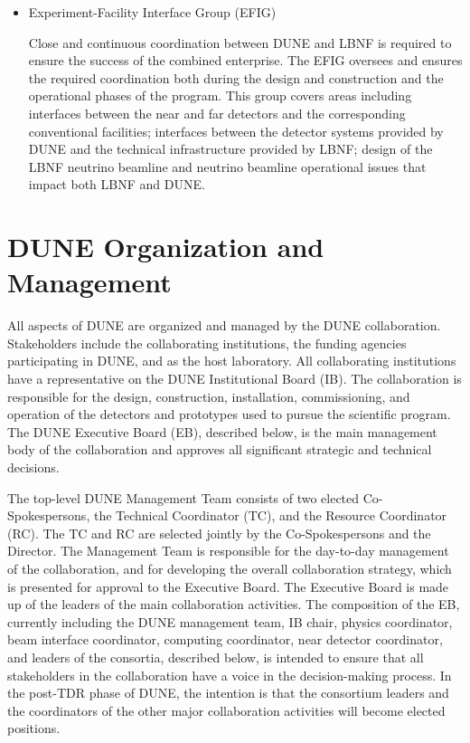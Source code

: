 \begin{itemize}
\item Experiment-Facility Interface Group (EFIG)

Close and continuous coordination between DUNE and LBNF is required to ensure the success of the combined enterprise. The EFIG  oversees and ensures the required coordination both during the design and construction and the operational phases of the program. This group covers areas including interfaces between the near and far detectors and the corresponding conventional facilities; interfaces between the detector systems provided by DUNE and the technical infrastructure provided by LBNF; design of the LBNF neutrino beamline and neutrino beamline operational issues that impact both LBNF and DUNE.  

\end{itemize}





\section{DUNE Organization and Management}

All aspects of DUNE are organized and managed by the DUNE collaboration.  Stakeholders include the collaborating institutions, the funding agencies participating in DUNE, and \fnal as the host laboratory.  All collaborating institutions have a representative on the DUNE Institutional Board (IB). The collaboration is responsible for the design, construction, installation, commissioning, and operation of the detectors and prototypes used to pursue the scientific program. The DUNE Executive Board (EB), described below, is the main management body of the collaboration and approves all significant strategic and technical decisions.

The top-level DUNE Management Team consists of two elected Co-Spokespersons, the Technical Coordinator (TC), and the Resource Coordinator (RC). The TC and RC are selected jointly by the Co-Spokespersons and the \fnal Director. The Management Team is responsible for the day-to-day management of the collaboration, and for developing the overall collaboration strategy, which is presented for approval to the Executive Board. The Executive Board is made up of the leaders of the main collaboration activities. The composition of the EB, currently including the DUNE management team, IB chair, physics coordinator, beam interface coordinator, computing coordinator, near detector coordinator, and leaders of the  consortia, described below, is intended to ensure
that all stakeholders in the collaboration have a voice in the decision-making process. 
In the post-TDR phase of DUNE, the intention is that the consortium leaders and the coordinators of the other major collaboration activities will become elected positions.

